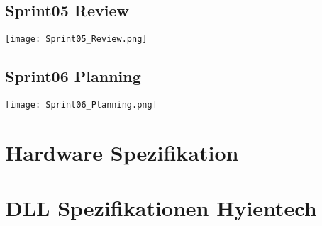 \newpage
\section*{Sprint05 Review}
\texttt{[image: Sprint05\_Review.png]}

\newpage
\section*{Sprint06 Planning}
\texttt{[image: Sprint06\_Planning.png]}

\newpage
\chapter{Hardware Spezifikation}
\label{app:ch:hardwarespez}


\chapter{DLL Spezifikationen Hyientech}
\label{app:ch:dllspezifikation}

